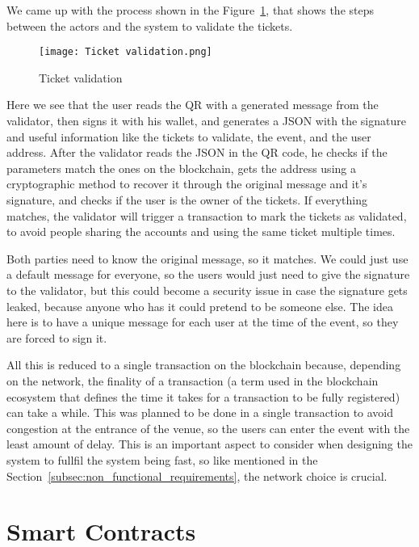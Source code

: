 We came up with the process shown in the Figure~\ref{fig:ticket_validation},
that shows the steps between the actors and the system to validate the tickets.

\begin{figure}[H]
	\texttt{[image: Ticket validation.png]}
	\centering
	\caption{Ticket validation}\label{fig:ticket_validation}
\end{figure}

Here we see that the user reads the QR with a generated message from the
validator, then signs it with his wallet, and generates a JSON with the
signature and useful information like the tickets to validate, the event, and
the user address. After the validator reads the JSON in the QR code, he checks
if the parameters match the ones on the blockchain, gets the address using a
cryptographic method to recover it through the original message and it's
signature, and checks if the user is the owner of the tickets. If everything
matches, the validator will trigger a transaction to mark the tickets as
validated, to avoid people sharing the accounts and using the same ticket
multiple times.

Both parties need to know the original message, so it matches. We could just
use a default message for everyone, so the users would just need to give the
signature to the validator, but this could become a security issue in case the
signature gets leaked, because anyone who has it could pretend to be someone
else. The idea here is to have a unique message for each user at the time of
the event, so they are forced to sign it.

All this is reduced to a single transaction on the blockchain because,
depending on the network, the finality of a transaction (a term used in the
blockchain ecosystem that defines the time it takes for a transaction to be
fully registered) can take a while. This was planned to be done in a single
transaction to avoid congestion at the entrance of the venue, so the users can
enter the event with the least amount of delay. This is an important aspect to
consider when designing the system to fullfil the system being fast, so like
mentioned in the Section~\ref{subsec:non_functional_requirements}, the network
choice is crucial.

\section{Smart Contracts}\label{sec:smart_contracts}

